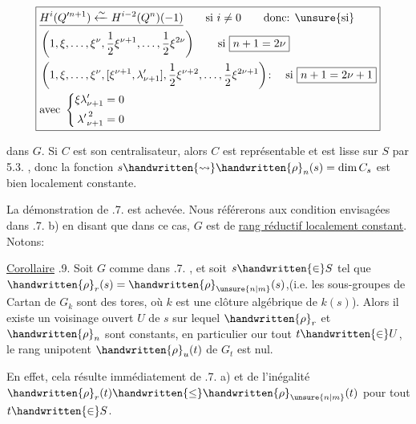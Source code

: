 {\small
\[
\boxed{\begin{aligned}
&\underline{H^i(Q^{\prime n+1})\xleftarrow{\sim}H^{i-2}(Q^n)(-1)}\qquad \text{si }i\ne0\qquad\text{donc: \unsure{si}}\\
&\left(1,\xi,\ldots,\xi^\nu,\frac12\xi^{\nu+1},\ldots,\frac12\xi^{2\nu}\right)\qquad\text{si }\boxed{n+1=2\nu}\\
&\left(1,\xi,\ldots,\xi^\nu,[\xi^{\nu+1},\lambda'_{\nu+1}],\frac12\xi^{\nu+2},\ldots,\frac12\xi^{2\nu+1}\right)\!:\quad\text{si }\boxed{n+1=2\nu+1}\\
&\hfill\text{avec }\left\{\begin{aligned}\xi\lambda'_{\nu+1}&=0\\{\lambda'}_{\nu+1}^{\,2}&=0\end{aligned}\right.
\end{aligned}}
\]
}


dans $G$. Si $C$ est son centralisateur, alors $C$ est représentable et est lisse sur $S$ par  5.3. , donc la fonction $s\handwritten{\leadsto}\handwritten{\rho}_n(s)=\dim C_s$ est bien localement constante.

 La démonstration de .7. est achevée. Nous référerons aux condition envisagées dans .7. b) en disant que dans ce cas, $G$ est de \uline{rang réductif localement constant}. Notons:

\uline{Corollaire} .9. Soit $G$ comme dans .7. , et soit $s\handwritten{\in}S$ tel que  $\handwritten{\rho}_r(s)=\handwritten{\rho}_{\unsure{n|m}}(s)$,(i.e. les sous-groupes de Cartan de $G_k$ sont des tores, où $k$ est une clôture algébrique de $k(s)$). Alors il existe un voisinage  ouvert $U$ de $s$ sur lequel $\handwritten{\rho}_r$ et $\handwritten{\rho}_n$ sont constants, en particulier our tout $t\handwritten{\in}U$, le rang unipotent $\handwritten{\rho}_u(t)$ de $G_t$ est nul.

En effet,  cela résulte immédiatement de .7. a) et de l'inégalité $\handwritten{\rho}_r(t)\handwritten{\leq}\handwritten{\rho}_{\unsure{n|m}}(t)$ pour tout $t\handwritten{\in}S$.

